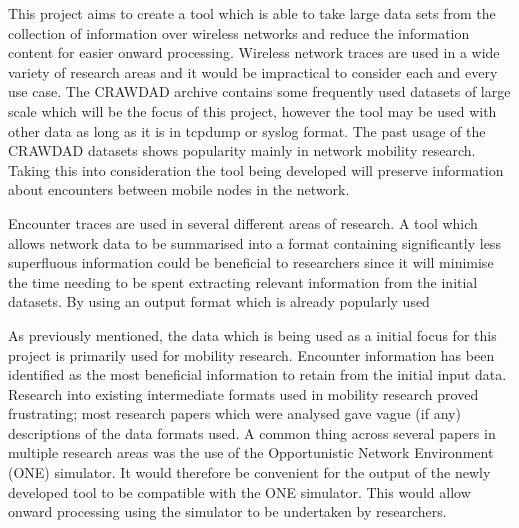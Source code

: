 This project aims to create a tool which is able to take large data sets from the collection of information over wireless networks and reduce the information content for easier onward processing. Wireless network traces are used in a wide variety of research areas and it would be impractical to consider each and every use case. The CRAWDAD archive contains some frequently used datasets of large scale which will be the focus of this project, however the tool may be used with other data as long as it is in tcpdump or syslog format. The past usage of the CRAWDAD datasets shows popularity mainly in network mobility research. Taking this into consideration the tool being developed will preserve information about encounters between mobile nodes in the network.

Encounter traces are used in several different areas of research. A tool which allows network data to be summarised into a format containing significantly less superfluous information could be beneficial to researchers since it will minimise the time needing to be spent extracting relevant information from the initial datasets. By using an output format which is already popularly used 

As previously mentioned, the data which is being used as a initial focus for this project is primarily used for mobility research. Encounter information has been identified as the most beneficial information to retain from the initial input data. Research into existing intermediate formats used in mobility research proved frustrating; most research papers which were analysed gave vague (if any) descriptions of the data formats used. A common thing across several papers in multiple research areas was the use of the Opportunistic Network Environment (ONE) simulator. It would therefore be convenient for the output of the newly developed tool to be compatible with the ONE simulator. This would allow onward processing using the simulator to be undertaken by researchers. 

